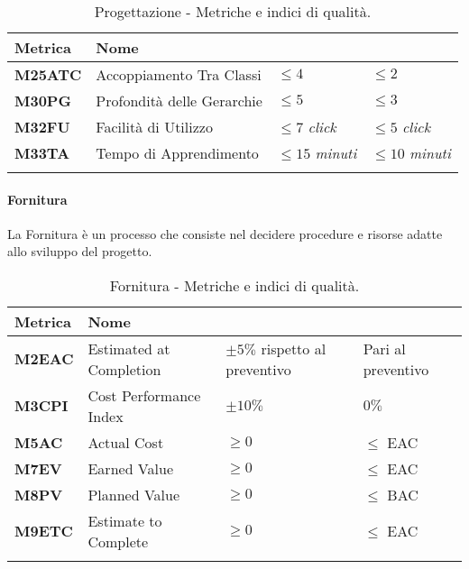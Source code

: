 \hspace{1pt}
    \begin{longtable}{|C{1.5cm}|L{3cm}|L{2.5cm}|L{2.5cm}|}
        \hline
        \textbf{Metrica} & \textbf{Nome} & \textbf{} & \textbf{} \\
        \hline
        \textbf{M25ATC} & Accoppiamento Tra Classi & $\leq 4$  & $\leq 2$ \\
        \hline
        \textbf{M30PG} & Profondità delle Gerarchie & $\leq 5$  & $\leq 3$ \\
        \hline
        \textbf{M32FU} & Facilità di Utilizzo & $\leq 7$ \textit{click}  & $\leq 5$ \textit{click} \\
        \hline
        \textbf{M33TA} & Tempo di Apprendimento & $\leq 15$ \textit{minuti}  & $\leq 10$ \textit{minuti} \\
        \hline
    \caption{Progettazione - Metriche e indici di qualità.}
    \label{tab:progettazione_progetto}
\end{longtable}

\paragraph{Fornitura}
La Fornitura è un processo che consiste nel decidere procedure e risorse
adatte allo sviluppo del progetto.

\hspace{1pt}
    \begin{longtable}{|C{1.5cm}|L{3cm}|L{2.5cm}|L{2.5cm}|}
        \hline
        \textbf{Metrica} & \textbf{Nome} & \textbf{} & \textbf{} \\
        \hline
        \textbf{M2EAC} & Estimated at Completion & $\pm 5\%$ rispetto al preventivo & Pari al preventivo \\
        \hline
        \textbf{M3CPI} & Cost Performance Index & $\pm 10\%$ & $0\%$ \\
        \hline
        \textbf{M5AC} & Actual Cost & $\geq 0 $ & $ \leq$ EAC  \\
        \hline
        \textbf{M7EV} & Earned Value & $\geq 0 $ & $\leq$ EAC  \\
        \hline
        \textbf{M8PV} & Planned Value & $\geq 0  $ & $ \leq$ BAC  \\
        \hline
        \textbf{M9ETC} & Estimate to Complete & $\geq 0  $ & $ \leq$ EAC  \\
        \hline
    \caption{Fornitura - Metriche e indici di qualità.}
    \label{tab:controllo_progetto}
\end{longtable}


